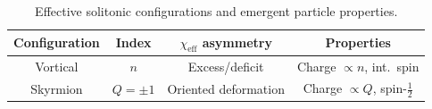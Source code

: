     \begin{table}[htbp]
      \centering
      \caption{Effective solitonic configurations and
      emergent particle properties.}
      \label{tab:solitons_charge}
      \begin{tabular}{|c|c|c|c|}
        \hline
        \textbf{Configuration} &
        \textbf{Index} &
        \textbf{$\chi_{\mathrm{eff}}$ asymmetry} &
        \textbf{Properties} \\
        \hline
        Vortical & $n$ &
        Excess/deficit &
        Charge $\propto n$, int.\ spin \\
        \hline
        Skyrmion & $Q=\pm 1$ &
        Oriented deformation &
        Charge $\propto Q$, spin-$\tfrac{1}{2}$ \\
        \hline
      \end{tabular}
    \end{table}
